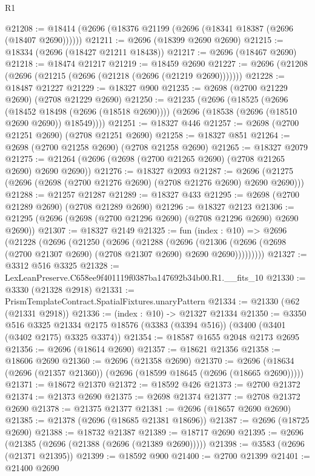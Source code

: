 \begin{lexlean}{R1}
\begin{coremodule}
@21208 := @18414 (@2696 (@18376 @21199 (@2696 (@18341 @18387 (@2696 (@18407 @2690))))))
@21211 := @2696 (@18399 @2690 @2690)
@21215 := @18334 (@2696 (@18427 @21211 @18438))
@21217 := @2696 (@18467 @2690)
@21218 := @18474 @21217
@21219 := @18459 @2690
@21227 := @2696 (@21208 (@2696 (@21215 (@2696 (@21218 (@2696 (@21219 @2690)))))))
@21228 := @18487 @21227
@21229 := @18327 @900
@21235 := @2698 (@2700 @21229 @2690) (@2708 @21229 @2690)
@21250 := @21235
    (@2696
      (@18525
        (@2696 (@18452 @18498 (@2696 (@18518 @2690))))
        (@2696 (@18538 (@2696 (@18510 @2690 @2690)) @18549))))
@21251 := @18327 @446
@21257 := @2698 (@2700 @21251 @2690) (@2708 @21251 @2690)
@21258 := @18327 @851
@21264 := @2698 (@2700 @21258 @2690) (@2708 @21258 @2690)
@21265 := @18327 @2079
@21275 := @21264 (@2696 (@2698 (@2700 @21265 @2690) (@2708 @21265 @2690) @2690 @2690))
@21276 := @18327 @2093
@21287 := @2696 (@21275 (@2696 (@2698 (@2700 @21276 @2690) (@2708 @21276 @2690) @2690 @2690)))
@21288 := @21257 @21287
@21289 := @18327 @433
@21295 := @2698 (@2700 @21289 @2690) (@2708 @21289 @2690)
@21296 := @18327 @2123
@21306 := @21295 (@2696 (@2698 (@2700 @21296 @2690) (@2708 @21296 @2690) @2690 @2690))
@21307 := @18327 @2149
@21325 := fun (index : @10) =>
  @2696
    (@21228
      (@2696
        (@21250
          (@2696
            (@21288
              (@2696
                (@21306 (@2696 (@2698 (@2700 @21307 @2690) (@2708 @21307 @2690) @2690 @2690)))))))))
@21327 := @3312 @516 @3325
@21328 := LexLeanPreserve.C658ee9f401119f0387ba147692b34b00.R1.__fits_10
@21330 := @3330 (@21328 @2918)
@21331 := PrismTemplateContract.SpatialFixtures.unaryPattern
@21334 := @21330 (@62 (@21331 @2918))
@21336 := (index : @10) -> @21327 @21334
@21350 := @3350
    @516
    @3325
    @21334
    @2175
    @18576
    (@3383 (@3394 @516))
    (@3400 (@3401 (@3402 @2175) @3325 @3374))
@21354 := @18587 @1655 @2048 @2173 @2695
@21356 := @2696 (@18614 @2690)
@21357 := @18621 @21356
@21358 := @18606 @2690
@21360 := @2696 (@21358 @2690)
@21370 := @2696 (@18634 (@2696 (@21357 @21360)) (@2696 (@18599 @18645 (@2696 (@18665 @2690)))))
@21371 := @18672 @21370
@21372 := @18592 @426
@21373 := @2700 @21372
@21374 := @21373 @2690
@21375 := @2698 @21374
@21377 := @2708 @21372 @2690
@21378 := @21375 @21377
@21381 := @2696 (@18657 @2690 @2690)
@21385 := @21378 (@2696 (@18685 @21381 @18696))
@21387 := @2696 (@18725 @2690)
@21388 := @18732 @21387
@21389 := @18717 @2690
@21395 := @2696 (@21385 (@2696 (@21388 (@2696 (@21389 @2690)))))
@21398 := @3583 (@2696 (@21371 @21395))
@21399 := @18592 @900
@21400 := @2700 @21399
@21401 := @21400 @2690

\end{coremodule}
\end{lexlean}
